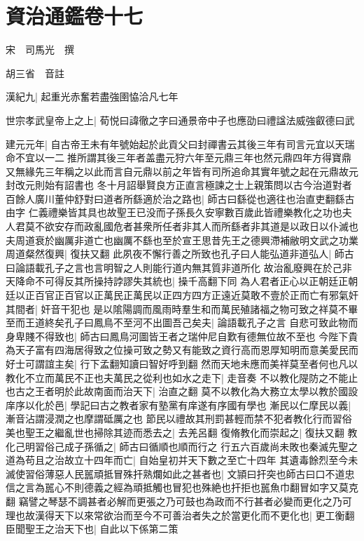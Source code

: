 \chapter{資治通鑑卷十七}
宋　司馬光　撰

胡三省　音註

漢紀九|{
	起重光赤奮若盡強圉恊洽凡七年}


世宗孝武皇帝上之上|{
	荀悦曰諱徹之字曰通景帝中子也應劭曰禮諡法威強叡德曰武}


建元元年|{
	自古帝王未有年號始起於此貢父曰封禪書云其後三年有司言元宜以天瑞命不宜以一二推所謂其後三年者盖盡元狩六年至元鼎三年也然元鼎四年方得寶鼎又無緣先三年稱之以此而言自元鼎以前之年皆有司所追命其實年號之起在元鼎故元封改元則始有詔書也}
冬十月詔舉賢良方正直言極諫之士上親策問以古今治道對者百餘人廣川董仲舒對曰道者所繇適於治之路也|{
	師古曰繇從也適往也治直吏翻繇古由字}
仁義禮樂皆其具也故聖王已没而子孫長久安寧數百歲此皆禮樂教化之功也夫人君莫不欲安存而政亂國危者甚衆所任者非其人而所繇者非其道是以政日以仆滅也夫周道衰於幽厲非道亡也幽厲不繇也至於宣王思昔先王之德興滯補敝明文武之功業周道粲然復興|{
	復扶又翻}
此夙夜不懈行善之所致也孔子曰人能弘道非道弘人|{
	師古曰論語載孔子之言也言明智之人則能行道内無其質非道所化}
故治亂廢興在於己非天降命不可得反其所操持誖謬失其統也|{
	操千高翻下同}
為人君者正心以正朝廷正朝廷以正百官正百官以正萬民正萬民以正四方四方正遠近莫敢不壹於正而亡有邪氣奸其間者|{
	奸音干犯也}
是以隂陽調而風雨時羣生和而萬民殖諸福之物可致之祥莫不畢至而王道終矣孔子曰鳳鳥不至河不出圖吾己矣夫|{
	論語載孔子之言}
自悲可致此物而身卑賤不得致也|{
	師古曰鳳鳥河圖皆王者之瑞仲尼自歎有德無位故不至也}
今陛下貴為天子富有四海居得致之位操可致之勢又有能致之資行高而恩厚知明而意美愛民而好士可謂誼主矣|{
	行下孟翻知讀曰智好呼到翻}
然而天地未應而美祥莫至者何也凡以教化不立而萬民不正也夫萬民之從利也如水之走下|{
	走音奏}
不以教化隄防之不能止也古之王者明於此故南面而治天下|{
	治直之翻}
莫不以教化為大務立太學以教於國設庠序以化於邑|{
	學記曰古之教者家有塾黨有庠遂有序國有學也}
漸民以仁摩民以義|{
	漸音沾謂浸潤之也摩謂砥厲之也}
節民以禮故其刑罰甚輕而禁不犯者教化行而習俗美也聖王之繼亂世也掃除其迹而悉去之|{
	去羌呂翻}
復脩教化而崇起之|{
	復扶又翻}
教化己明習俗己成子孫循之|{
	師古曰循順也順而行之}
行五六百歲尚未敗也秦滅先聖之道為苟且之治故立十四年而亡|{
	自始皇初并天下數之至亡十四年}
其遺毒餘烈至今未滅使習俗薄惡人民嚚頑抵冒殊扞熟爛如此之甚者也|{
	文頴曰扞突也師古曰口不道忠信之言為嚚心不則德義之經為頑抵觸也冒犯也殊絶也扞拒也嚚魚巾翻冒如字又莫克翻}
竊譬之琴瑟不調甚者必解而更張之乃可鼓也為政而不行甚者必變而更化之乃可理也故漢得天下以來常欲治而至今不可善治者失之於當更化而不更化也|{
	更工衡翻}
臣聞聖王之治天下也|{
	自此以下係第二策}
